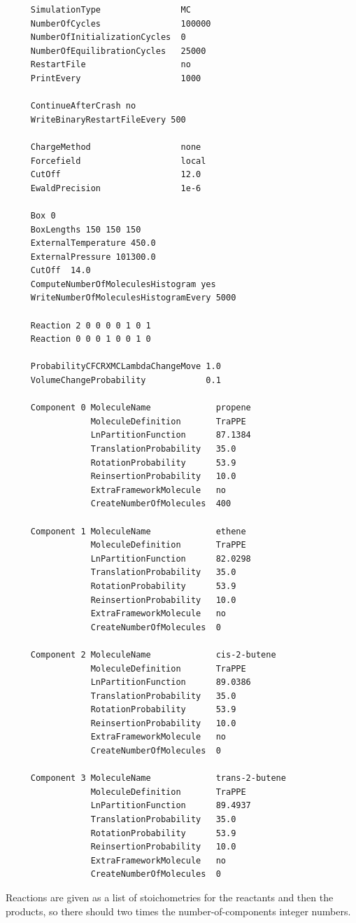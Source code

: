 \begin{tiny}
\begin{verbatim}
     SimulationType                MC
     NumberOfCycles                100000
     NumberOfInitializationCycles  0
     NumberOfEquilibrationCycles   25000
     RestartFile                   no
     PrintEvery                    1000
     
     ContinueAfterCrash no
     WriteBinaryRestartFileEvery 500
     
     ChargeMethod                  none
     Forcefield                    local
     CutOff                        12.0
     EwaldPrecision                1e-6
     
     Box 0
     BoxLengths 150 150 150
     ExternalTemperature 450.0
     ExternalPressure 101300.0
     CutOff  14.0
     ComputeNumberOfMoleculesHistogram yes
     WriteNumberOfMoleculesHistogramEvery 5000
     
     Reaction 2 0 0 0 0 1 0 1
     Reaction 0 0 0 1 0 0 1 0
     
     ProbabilityCFCRXMCLambdaChangeMove 1.0
     VolumeChangeProbability            0.1
     
     Component 0 MoleculeName             propene
                 MoleculeDefinition       TraPPE
                 LnPartitionFunction      87.1384
                 TranslationProbability   35.0
                 RotationProbability      53.9
                 ReinsertionProbability   10.0
                 ExtraFrameworkMolecule   no
                 CreateNumberOfMolecules  400
     
     Component 1 MoleculeName             ethene
                 MoleculeDefinition       TraPPE
                 LnPartitionFunction      82.0298
                 TranslationProbability   35.0
                 RotationProbability      53.9
                 ReinsertionProbability   10.0
                 ExtraFrameworkMolecule   no
                 CreateNumberOfMolecules  0
     
     Component 2 MoleculeName             cis-2-butene
                 MoleculeDefinition       TraPPE
                 LnPartitionFunction      89.0386
                 TranslationProbability   35.0
                 RotationProbability      53.9
                 ReinsertionProbability   10.0
                 ExtraFrameworkMolecule   no
                 CreateNumberOfMolecules  0
     
     Component 3 MoleculeName             trans-2-butene
                 MoleculeDefinition       TraPPE
                 LnPartitionFunction      89.4937
                 TranslationProbability   35.0
                 RotationProbability      53.9
                 ReinsertionProbability   10.0
                 ExtraFrameworkMolecule   no
                 CreateNumberOfMolecules  0
\end{verbatim}
\end{tiny}
Reactions are given as a list of stoichometries for the reactants and then the products, so there should two times the number-of-components integer numbers.

